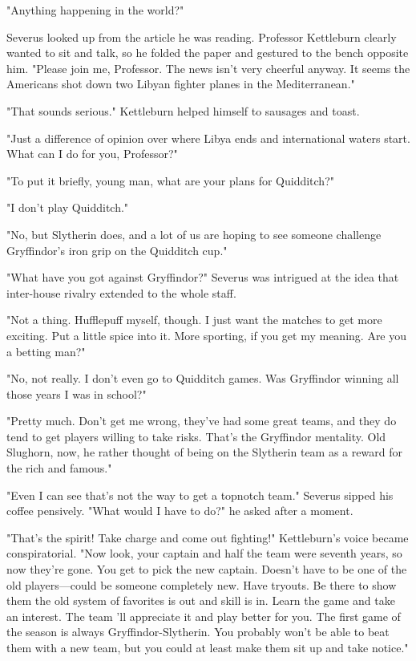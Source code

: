 "Anything happening in the world?"

Severus looked up from the article he was reading. Professor Kettleburn clearly wanted to sit and talk, so he folded the paper and gestured to the bench opposite him. "Please join me, Professor. The news isn't very cheerful anyway. It seems the Americans shot down two Libyan fighter planes in the Mediterranean."

"That sounds serious." Kettleburn helped himself to sausages and toast.

"Just a difference of opinion over where Libya ends and international waters start. What can I do for you, Professor?"

"To put it briefly, young man, what are your plans for Quidditch?"

"I don't play Quidditch."

"No, but Slytherin does, and a lot of us are hoping to see someone challenge Gryffindor's iron grip on the Quidditch cup."

"What have you got against Gryffindor?" Severus was intrigued at the idea that inter-house rivalry extended to the whole staff.

"Not a thing. Hufflepuff myself, though. I just want the matches to get more exciting. Put a little spice into it. More sporting, if you get my meaning. Are you a betting man?"

"No, not really. I don't even go to Quidditch games. Was Gryffindor winning all those years I was in school?"

"Pretty much. Don't get me wrong, they've had some great teams, and they do tend to get players willing to take risks. That's the Gryffindor mentality. Old Slughorn, now, he rather thought of being on the Slytherin team as a reward for the rich and famous."

"Even I can see that's not the way to get a topnotch team." Severus sipped his coffee pensively. "What would I have to do?" he asked after a moment.

"That's the spirit! Take charge and come out fighting!" Kettleburn's voice became conspiratorial. "Now look, your captain and half the team were seventh years, so now they're gone. You get to pick the new captain. Doesn't have to be one of the old players—could be someone completely new. Have tryouts. Be there to show them the old system of favorites is out and skill is in. Learn the game and take an interest. The team 'll appreciate it and play better for you. The first game of the season is always Gryffindor-Slytherin. You probably won't be able to beat them with a new team, but you could at least make them sit up and take notice."

